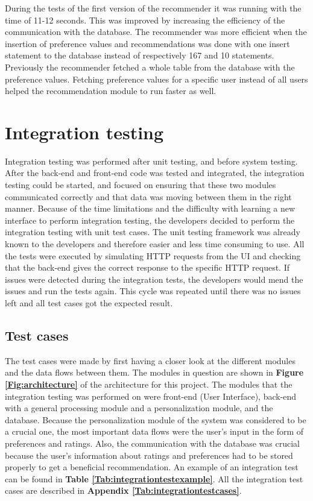 During the tests of the first version of the recommender it was running with the time of 11-12 seconds. This was improved by increasing the efficiency of the communication with the database. The recommender was more efficient when the insertion of preference values and recommendations was done with one insert statement to the database instead of respectively 167 and 10 statements. Previously the recommender fetched a whole table from the database with the preference values. Fetching preference values for a specific user instead of all users helped the recommendation module to run faster as well.

\section{Integration testing}
\label{sec:integration_testing}

Integration testing was performed after unit testing, and before system testing. After the back-end and front-end code was tested and integrated, the integration testing could be started, and focused on ensuring that these two modules communicated correctly and that data was moving between them in the right manner. 
Because of the time limitations and the difficulty with learning a new interface to perform integration testing, the developers decided to perform the integration testing with unit test cases. The unit testing framework was already known to the developers and therefore easier and less time consuming to use. All the tests were executed by simulating HTTP requests from the UI and checking that the back-end gives the correct response to the specific HTTP request. 
If issues were detected during the integration tests, the developers would mend the issues and run the tests again. This cycle was repeated until there was no issues left and all test cases got the expected result. \newline


\subsection{Test cases}
The test cases were made by first having a closer look at the different modules and the data flows between them. The modules in question are shown in \textbf{Figure \ref{Fig:architecture}} of the architecture for this project. The modules that the integration testing was performed on were front-end (User Interface), back-end with a general processing module and a personalization module, and the database. Because the personalization module of the system was considered to be a crucial one, the most important data flows were the user's input in the form of preferences and ratings. Also, the communication with the database was crucial because the user's information about ratings and preferences had to be stored properly to get a beneficial recommendation. An example of an integration test can be found in \textbf{Table \ref{Tab:integrationtestexample}}. All the integration test cases are described in \textbf{Appendix \ref{Tab:integrationtestcases}}.

